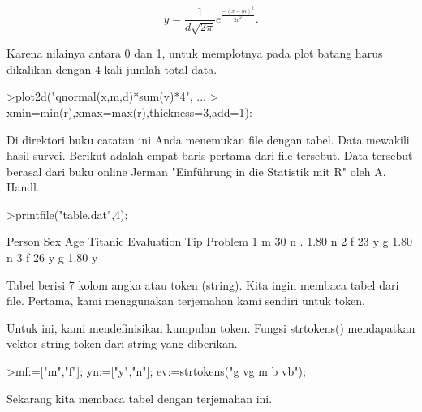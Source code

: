 \documentclass[a4paper,10pt]{article}
\begin{document}
\begin{eulernotebook}
\begin{eulercomment}
\end{eulercomment}
\begin{eulerformula}
\[
y=\frac{1}{d\sqrt{2\pi}}e^{\frac{-(x-m)^2}{2d^2}}.
\]
\end{eulerformula}
\begin{eulercomment}
Karena nilainya antara 0 dan 1, untuk memplotnya pada plot batang
harus dikalikan dengan 4 kali jumlah total data.
\end{eulercomment}
\begin{eulerprompt}
>plot2d("qnormal(x,m,d)*sum(v)*4", ...
>  xmin=min(r),xmax=max(r),thickness=3,add=1):
\end{eulerprompt}
\begin{eulercomment}
Di direktori buku catatan ini Anda menemukan file dengan tabel. Data
mewakili hasil survei. Berikut adalah empat baris pertama dari file
tersebut. Data tersebut berasal dari buku online Jerman "Einführung in
die Statistik mit R" oleh A. Handl.
\end{eulercomment}
\begin{eulerprompt}
>printfile("table.dat",4);
\end{eulerprompt}
\begin{euleroutput}
  Person Sex Age Titanic Evaluation Tip Problem
  1 m 30 n . 1.80 n
  2 f 23 y g 1.80 n
  3 f 26 y g 1.80 y
\end{euleroutput}
\begin{eulercomment}
Tabel berisi 7 kolom angka atau token (string). Kita ingin membaca
tabel dari file. Pertama, kami menggunakan terjemahan kami sendiri
untuk token.

Untuk ini, kami mendefinisikan kumpulan token. Fungsi strtokens()
mendapatkan vektor string token dari string yang diberikan.
\end{eulercomment}
\begin{eulerprompt}
>mf:=["m","f"]; yn:=["y","n"]; ev:=strtokens("g vg m b vb");
\end{eulerprompt}
\begin{eulercomment}
Sekarang kita membaca tabel dengan terjemahan ini.


\end{eulercomment}
\end{eulernotebook}
\end{document}
